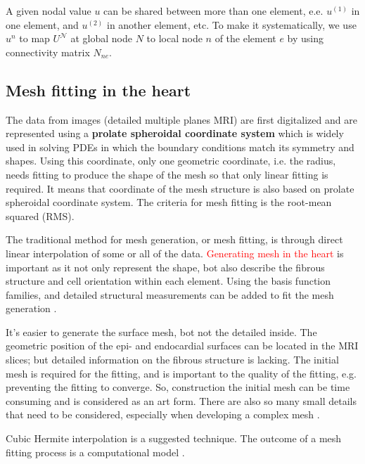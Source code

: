 A given nodal value $u$ can be shared between more than one element, e.e.
$u^{(1)}$ in one element, and $u^{(2)}$ in another element, etc. To make it
systematically, we use $u^n$ to map $U^{\mathcal{N}}$ at global node $N$ to
local node $n$ of the element $e$ by using connectivity matrix $N_{ne}$.

\subsection{Mesh fitting in the heart}

The data from images (detailed multiple planes MRI) are first digitalized and
are represented using a {\bf prolate spheroidal coordinate system} which is
widely used in solving PDEs in which the boundary conditions match its symmetry
and shapes. Using this coordinate, only one geometric coordinate, i.e. the
radius, needs fitting to produce the shape of the mesh so that only linear
fitting is required. It means that coordinate of the mesh structure is also
based on prolate spheroidal coordinate system. The criteria for mesh fitting is
the root-mean squared (RMS). 

The traditional method for mesh generation, or mesh fitting, is through direct
linear interpolation of some or all of the data. \textcolor{red}{Generating mesh
in the heart} is important as it not only represent the shape, bot also describe
the fibrous structure and cell orientation within each element. Using the basis
function families, and detailed structural measurements can be added to fit the
mesh generation \citep{krishnamurthy1998}.

It's easier to generate the surface mesh, bot not the detailed inside. The
geometric position of the epi- and endocardial surfaces can be located in the
MRI slices; but detailed information on the fibrous structure is lacking.
The initial mesh is required for the fitting, and is important to the quality of
the fitting, e.g. preventing the fitting to converge. So, construction the
initial mesh can be time consuming and is considered as an art form. There are
also so many small details that need to be considered, especially when
developing a complex mesh \citep{bradley1997}. 


Cubic Hermite interpolation is a suggested technique. The outcome of a mesh
fitting process is a computational model \citep{nielsen1991}. 

